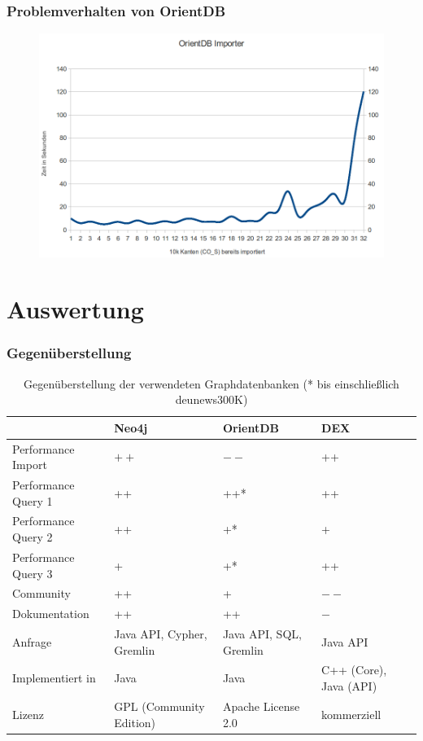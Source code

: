 \documentclass{beamer}
\begin{document}
\begin{frame}\frametitle{Problemverhalten von OrientDB}
\begin{figure}[ht]
\centering
\includegraphics[scale=0.28]{../report/pics/OrientImporter}
\label{fig:mysql_schema}
\end{figure}
\end{frame}

\section{Auswertung}
\begin{frame}\frametitle{Gegenüberstellung}

	\renewcommand{\arraystretch}{1.5}
	
	\begin{table}[ht]
	\begin{tabular}{|l||p{2.5cm}|p{2.5cm}|p{2.5cm}|}
	\hline 
	 & \textbf{Neo4j} & \textbf{OrientDB} & \textbf{DEX} \\ 
	\hline
	Performance Import & $++$ & $--$ & ++ \\ 
	\hline 
	Performance Query 1 & ++ & ++* & ++ \\ 
	\hline 
	Performance Query 2 & ++ & +* & + \\ 
	\hline 
	Performance Query 3 & + & +* & ++ \\ 
	\hline
	Community & ++ & + & $--$ \\ 
	\hline 
	Dokumentation & ++ & ++ & $-$ \\
	\hline 
	Anfrage & Java API, Cypher, Gremlin & Java API, SQL, Gremlin & Java API \\
	\hline
	Implementiert in & Java & Java & C++ (Core), Java (API) \\
	\hline 
	Lizenz & GPL (Community Edition) & Apache License 2.0 & kommerziell	 \\ 
	\hline 
	\end{tabular}
	\caption{Gegenüberstellung der verwendeten Graphdatenbanken (* bis einschließlich deu\textunderscore news\textunderscore 300K)}
	\label{tab:compare}
	\end{table}
\normalfont
\end{frame}
\end{document}
